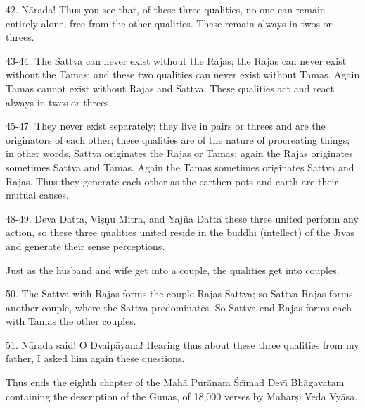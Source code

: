 42. N\=arada! Thus you see that, of these three qualities, no one can remain entirely alone, free from the other qualities. These remain always in twos or threes.

43-44. The Sattva can never exist without the Rajas; the Rajas can never exist without the Tamas; and these two qualities can never exist without Tamas. Again Tamas cannot exist without Rajas and Sattva. These qualities act and react always in twos or threes.

45-47. They never exist separately; they live in pairs or threes and are the originators of each other; these qualities are of the nature of procreating things; in other words, Sattva originates the Rajas or Tamas; again the Rajas originates sometimes Sattva and Tamas. Again the Tamas sometimes originates Sattva and Rajas. Thus they generate each other as the earthen pots and earth are their mutual causes.

48-49. Deva Datta, Vi\d{s}\d{n}u Mitra, and Yaj\~na Datta these three united perform any action, so these three qualities united reside in the buddhi (intellect) of the J\={\i}vas and generate their sense perceptions.

Just as the husband and wife get into a couple, the qualities get into couples.

50. The Sattva with Rajas forms the couple Rajas Sattva; so Sattva Rajas forms another couple, where the Sattva predominates. So Sattva end Rajas forms each with Tamas the other couples.

51. N\=arada said! O Dvaip\=ayana! Hearing thus about these three qualities from my father, I asked him again these questions.

Thus ends the eighth chapter of the Mah\=a Pur\=a\d{n}am \'Sr\={\i}mad Dev\={\i} Bh\=agavatam containing the description of the Gu\d{n}as, of 18,000 verses by Mahar\d{s}i Veda Vy\=asa.



